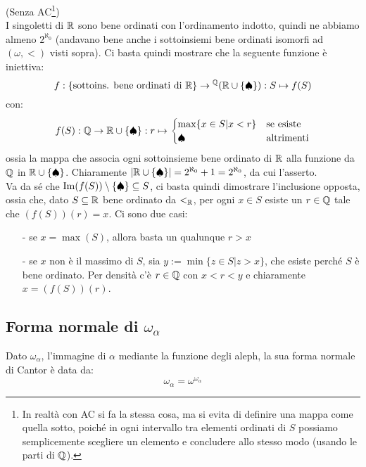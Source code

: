 \begin{soln}
	(Senza AC\footnote{In realtà con AC si fa la stessa cosa, ma si evita di definire una mappa come quella sotto, poiché in ogni intervallo tra elementi ordinati di $S$ possiamo semplicemente scegliere un elemento e concludere allo stesso modo (usando le parti di $\mathbb Q$).})\\
	I singoletti di $\mathbb R$ sono bene ordinati con l'ordinamento indotto, quindi ne abbiamo almeno $2^{\aleph_0}$ (andavano bene anche i sottoinsiemi bene ordinati isomorfi ad $(\omega,<)$ visti sopra).
	Ci basta quindi mostrare che la seguente funzione è iniettiva:
	\[ f : \{\text{sottoins. bene ordinati di $\mathbb R$}\} \to {}^\mathbb Q(\mathbb R \cup \{\spadesuit\}) : S \mapsto f(S)
		\]
	con:
	\[ f(S) : \mathbb Q \to \mathbb R \cup \{\spadesuit\} : r \mapsto \begin{cases}
		\max\{x \in S | x < r\} &\text{se esiste} \\
		\spadesuit &\text{altrimenti}
	\end{cases}
		\]
	ossia la mappa che associa ogni sottoinsieme bene ordinato di $\mathbb R$ alla funzione da $\mathbb Q$ in $\mathbb R \cup \{\spadesuit\}$. Chiaramente $|\mathbb R \cup \{\spadesuit\}| = 2^{\aleph_0} + 1 = 2^{\aleph_0}$, da cui l'asserto.\\
	Va da sé che $\operatorname{Im}(f(S))\setminus\{\spadesuit\} \subseteq S$, ci basta quindi dimostrare l'inclusione opposta, ossia che, dato $S \subseteq \mathbb R$ bene ordinato da $<_{\mathbb R}$, per ogni $x \in S$ esiste un $r \in \mathbb Q$ tale che $(f(S))(r) = x$. Ci sono due casi:
	\begin{itemize}
		\item[-] se $x = \max(S)$, allora basta un qualunque $r > x$
		\item[-] se $x$ non è il massimo di $S$, sia $y := \min\{z \in S | z > x\}$, che esiste perché $S$ è bene ordinato. Per densità c'è $r \in \mathbb Q$ con $x<r<y$ e chiaramente $x = (f(S))(r)$.
	\end{itemize}
\end{soln}

\pagebreak
\subsection{\texorpdfstring{Forma normale di $\omega_\alpha$}{Forma normale di omega-alpha}}
\begin{proposition}[$\omega_\alpha = \omega^{\omega_\alpha}$]
	Dato $\omega_\alpha$, l'immagine di $\alpha$ mediante la funzione degli aleph, la sua forma normale di Cantor è data da:
	\[ \omega_\alpha = \omega^{\omega_\alpha}
		\]
\end{proposition}

